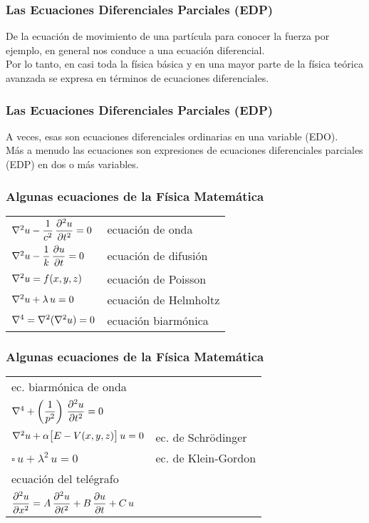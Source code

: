 \documentclass[12pt]{beamer}
\begin{document}
\begin{frame}
\frametitle{Las Ecuaciones Diferenciales Parciales (EDP)}
De la ecuación de movimiento de una partícula para conocer la fuerza por ejemplo, en general nos conduce a una ecuación diferencial.
\\
\bigskip
\pause
Por lo tanto, en casi toda la física  básica y en una mayor parte de la física teórica avanzada se expresa en términos de ecuaciones diferenciales.
\end{frame}
\begin{frame}
\frametitle{Las Ecuaciones Diferenciales Parciales (EDP)}
A veces, esas son ecuaciones diferenciales ordinarias en una variable (EDO).
\\
\bigskip
\pause
Más a menudo las ecuaciones son expresiones de ecuaciones diferenciales parciales (EDP) en dos o más variables.
\end{frame}
\begin{frame}
\frametitle{Algunas ecuaciones de la Física Matemática}
\begin{table}
\renewcommand{\arraystretch}{1.6}
\begin{tabular}{l@{\hskip 1cm} l@{\hskip 2cm}}
$\laplacian{u} - \dfrac{1}{c^{2}} \, \displaystyle \pdv[2]{u}{t} = 0$ &ecuación de onda \pause \\
$\laplacian{u} - \dfrac{1}{k} \, \displaystyle \pdv{u}{t} = 0$ & ecuación de difusión \pause \\
$\laplacian{u} = f(x, y, z)$ & ecuación de Poisson \pause \\
$\laplacian{u} + \lambda \, u = 0$ & ecuación de Helmholtz \pause \\
$\nabla^{4} = \laplacian{(\laplacian{u})} = 0$ & ecuación biarmónica
\end{tabular}
\end{table}
\end{frame}
\begin{frame}
\frametitle{Algunas ecuaciones de la Física Matemática}
\begin{table}
\renewcommand{\arraystretch}{1.5}
\begin{tabular}{l l@{\hskip 0.6cm}}
ec. biarmónica de onda & \\
$\nabla^{4} + \left( \dfrac{1}{p^{2}} \right) \, \displaystyle \pdv[2]{u}{t} = 0$ &  \pause \\
$\laplacian{u} + \alpha \big[ E - V(x, y, z) \big] \, u = 0$ & ec. de Schrödinger \pause \\
$\square \, u + \lambda^{2} \, u = 0$ & ec. de Klein-Gordon \pause \\
ecuación del telégrafo & \\
$\displaystyle \pdv[2]{u}{x} = A \, \displaystyle \pdv[2]{u}{t} + B \, \displaystyle \pdv{u}{t} + C \, u$ & \\
\end{tabular}
\end{table}
\end{frame}
\end{document}
